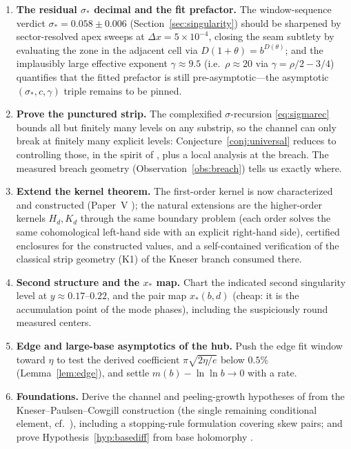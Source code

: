 \documentclass[11pt,a4paper]{article}
\theoremstyle{definition}
\theoremstyle{remark}
\begin{document}
\begin{enumerate}
\item \textbf{The residual $\sigma_*$ decimal and the fit prefactor.} The
window-sequence verdict $\sigma_*=0.058\pm0.006$ (Section~\ref{sec:singularity}) should be
sharpened by sector-resolved apex sweeps at $\Delta x=5\times10^{-4}$, closing the seam
subtlety by evaluating the zone in the adjacent cell via $D(1+\theta)=b^{D(\theta)}$; and
the implausibly large effective exponent $\gamma\approx9.5$ (i.e.\ $\rho\approx20$ via
$\gamma=\rho/2-3/4$) quantifies that the fitted prefactor is still pre-asymptotic---the
asymptotic $(\sigma_*,c,\gamma)$ triple remains to be pinned.
\item \textbf{Prove the punctured strip.} The complexified $\sigma$-recursion
\eqref{eq:sigmarec} bounds all but finitely many levels on any substrip, so the channel can
only break at finitely many explicit levels: Conjecture~\ref{conj:universal} reduces to
controlling those, in the spirit of \cite[Rem.~7.3]{unified}, plus a local analysis at the
breach. The measured breach geometry (Observation~\ref{obs:breach}) tells us exactly where.
\item \textbf{Extend the kernel theorem.} The first-order kernel is now
characterized and constructed (Paper~V \cite{paperV}); the natural extensions are the
higher-order kernels $H_d,K_d$ through the same boundary problem (each order solves the
same cohomological left-hand side with an explicit right-hand side), certified enclosures
for the constructed values, and a self-contained verification of the classical strip
geometry (K1) of the Kneser branch consumed there.
\item \textbf{Second structure and the $x_*$ map.} Chart the indicated second singularity
level at $y\approx0.17$--$0.22$, and the pair map $x_*(b,d)$ (cheap: it is the accumulation
point of the mode phases), including the suspiciously round measured centers.
\item \textbf{Edge and large-base asymptotics of the hub.} Push the edge fit window toward
$\eta$ to test the derived coefficient $\pi\sqrt{2\eta/e}$ below $0.5\%$
(Lemma~\ref{lem:edge}), and settle $m(b)-\ln\ln b\to0$ with a rate.
\item \textbf{Foundations.} Derive the channel and peeling-growth hypotheses of
\cite{phaselaw} from the Kneser--Paulsen--Cowgill construction (the single remaining
conditional element, cf.\ \cite[Rem.~7.4]{unified}), including a stopping-rule formulation
covering skew pairs; and prove Hypothesis~\ref{hyp:basediff} from base holomorphy
\cite{paulsen}.
\end{enumerate}
\end{document}
